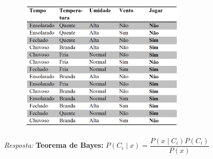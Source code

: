 \documentclass{article}
\begin{document}
\begin{figure}[H]
    \centering 
    \includegraphics[width=8cm]{tab-5-2-4.png} 
  \end{figure}

\textit{Resposta:} 
\textbf{Teorema de Bayes:}
$P(C_i \mid x) = \dfrac{P(x \mid C_i)P(C_i)}{P(x)}$
\end{document}
